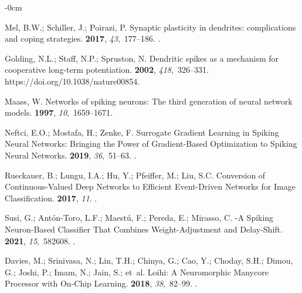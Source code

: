 \documentclass[brainsci, %
               review,accept,pdftex,moreauthors
               ]{Definitions/mdpi}
\begin{document}
\begin{adjustwidth}{-\extralength}{0cm}
\begin{thebibliography}{999}
Mel, B.W.; Schiller, J.; Poirazi, P.
\newblock Synaptic plasticity in dendrites: complications and coping
  strategies.
 {\bf 2017}, {\em 43},~177--186.
.

Golding, N.L.; Staff, N.P.; Spruston, N.
\newblock Dendritic spikes as a mechanism for cooperative long-term
  potentiation.
 {\bf 2002}, {\em 418},~326--331.
  {{https://doi.org/10.1038/nature00854}}.

Maass, W.
\newblock Networks of spiking neurons: {The} third generation of neural network
  models.
 {\bf 1997}, {\em 10},~1659--1671.

Neftci, E.O.; Mostafa, H.; Zenke, F.
\newblock Surrogate {Gradient} {Learning} in {Spiking} {Neural} {Networks}:
  {Bringing} the {Power} of {Gradient}-{Based} {Optimization} to {Spiking}
  {Neural} {Networks}.
 {\bf 2019}, {\em 36},~51--63.\linebreak
{}.

Rueckauer, B.; Lungu, I.A.; Hu, Y.; Pfeiffer, M.; Liu, S.C.
\newblock Conversion of {Continuous}-{Valued} {Deep} {Networks} to {Efficient}
  {Event}-{Driven} {Networks} for {Image} {Classification}.
 {\bf 2017}, {\em 11}.
.

Susi, G.; Antón-Toro, L.F.; Maestú, F.; Pereda, E.; Mirasso, C.
-{A} {Spiking} {Neuron}-{Based} {Classifier} {That} {Combines}
  {Weight}-{Adjustment} and {Delay}-{Shift}.
 {\bf 2021}, {\em 15},~582608.
.

Davies, M.; Srinivasa, N.; Lin, T.H.; Chinya, G.; Cao, Y.; Choday, S.H.; Dimou,
  G.; Joshi, P.; Imam, N.; Jain, S.;  et~al.
\newblock Loihi: {A} {Neuromorphic} {Manycore} {Processor} with {On}-{Chip}
  {Learning}.
 {\bf 2018}, {\em 38},~82--99.
.


\end{thebibliography}
\end{adjustwidth}
\end{document}
